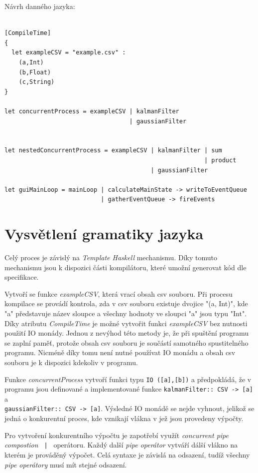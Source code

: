 \documentclass[male,czech]{kithesis}
\newcommand{\haskellInline}[1]{\colorbox{gray!10}{\texttt{#1}}}
\begin{document}
\setlength{\parindent}{0pt}
Návrh danného jazyka:

\begin{verbatim}

[CompileTime]
{
  let exampleCSV = "example.csv" :
    (a,Int)
    (b,Float)
    (c,String)
}

let concurrentProcess = exampleCSV | kalmanFilter 
                                   | gaussianFilter 
                                      

let nestedConcurrentProcess = exampleCSV | kalmanFilter | sum
                                                        | product
                                         | gaussianFilter

let guiMainLoop = mainLoop | calculateMainState -> writeToEventQueue
                           | gatherEventQueue -> fireEvents

\end{verbatim}

\section{Vysvětlení gramatiky jazyka}

Celý proces je závislý na \textit{Template Haskell} mechanismu. Díky tomuto mechanismu jsou k dispozici části kompilátoru, které umožní generovat kód dle specifikace.

Vytvoří se funkce \textit{exampleCSV}, která vrací obsah csv souboru. Při procesu kompilace se provádí kontrola, zda v csv souboru existuje dvojice "(a, Int)", kde "a" představuje název sloupce a všechny hodnoty ve sloupci "a" jsou typu "Int".
Díky atributu \textit{CompileTime} je možné vytvořit funkci \textit{exampleCSV} bez nutnosti použití IO monády. Jednou z nevýhod této metody je, že při spuštění programu se zaplní paměť, protože obsah csv souboru je součástí samotného spustitelného programu.
Nicméně díky tomu není nutné používat IO monádu a obsah csv souboru je k dispozici kdekoliv v programu.

Funkce \textit{concurrentProcess} vytvoří funkci typu \haskellInline{IO ([a],[b])} a předpokládá, že v programu jsou definované a implementované funkce
\haskellInline{kalmanFilter:: CSV -> [a]} a \\
\haskellInline{gaussianFilter:: CSV -> [a]}. Výsledné IO monádě se nejde vyhnout, jelikož se jedná o konkurentní proces, kde vznikají vlákna v jež jsou provedeny výpočty. 

Pro vytvoření konkurentního výpočtu je zapotřebí využít \textit{concurrent pipe compostion}
\haskellInline{ | } operátoru. Každý další \textit{pipe operátor} vytváří dálší vlákno na kterém je prováděný výpočet.
Celá syntaxe je závislá na odsazení, tudíž všechny \textit{pipe operátory} musí mít stejné odsazení.
\end{document}
